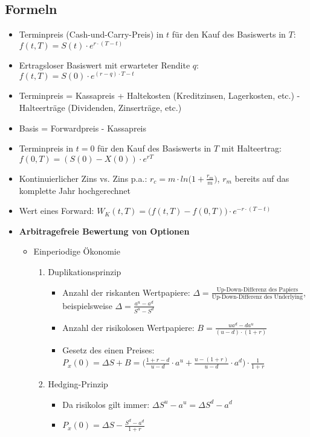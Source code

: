 \subsection{Formeln}
\begin{itemize}
	\item Terminpreis (Cash-und-Carry-Preis) in \(t\) für den Kauf des Basiswerts in \(T\): \(f(t,T) = S(t)\cdot e^{r\cdot (T-t)}\)
	\item Ertragsloser Basiswert mit erwarteter Rendite \(q\): \(f(t,T) = S(0) \cdot e^{(r-q)\cdot T-t}\)
	\item Terminpreis = Kassapreis + Haltekosten (Kreditzinsen, Lagerkosten, etc.) - Halteerträge (Dividenden, Zinserträge, etc.)
	\item Basis = Forwardpreis - Kassapreis
	\item Terminpreis in \(t=0\) für den Kauf des Basiswerts in \(T\) mit Halteertrag: \(f(0,T) = (S(0)-X(0))\cdot e^{rT}\)
	\item Kontinuierlicher Zins vs. Zins p.a.: \(r_c = m \cdot ln\Big(1+\frac{r_m}{m}\Big)\), \(r_m\) bereits auf das komplette Jahr hochgerechnet
	\item Wert eines Forward: \(W_K(t,T) = \Big(f(t,T)-f(0,T)\Big) \cdot e^{-r\cdot (T-t)}\)
	\item \textbf{Arbitragefreie Bewertung von Optionen}
	\begin{itemize}
		\item Einperiodige Ökonomie
		\begin{enumerate}
			\item Duplikationsprinzip
			\begin{itemize}
				\item Anzahl der riskanten Wertpapiere: \(\Delta = \frac{\text{Up-Down-Differenz des Papiers}}{\text{Up-Down-Differenz des Underlying}}\), beispielsweise \(\Delta=\frac{a^u-a^d}{S^u-S^d}\)
				\item Anzahl der risikolosen Wertpapiere: \(B=\frac{ua^d-da^u}{(u-d)\cdot(1+r)}\)
				\item Gesetz des einen Preises: \(P_x(0)=\Delta S+B=\Big(\frac{1+r-d}{u-d}\cdot a^u + \frac{u-(1+r)}{u-d}\cdot a^d\Big)\cdot\frac{1}{1+r}\)
			\end{itemize}
			\item Hedging-Prinzip
			\begin{itemize}
				\item Da risikolos gilt immer: \(\Delta S^u - a^u = \Delta S^d - a^d\)
				\item \(P_x(0) = \Delta S - \frac{S^d - a^d}{1+r}\)

\end{itemize}
\end{enumerate}
\end{itemize}
\end{itemize}
